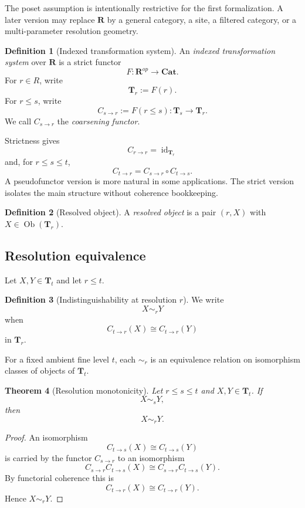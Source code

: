 \documentclass[11pt]{article}
\newtheorem{theorem}{Theorem}[section]
\theoremstyle{definition}
\newtheorem{definition}[theorem]{Definition}
\theoremstyle{remark}
\newcommand{\Rcat}{\mathbf R}
\newcommand{\Tcat}{\mathbf T}
\newcommand{\Cat}{\mathbf{Cat}}
\newcommand{\Ob}{\operatorname{Ob}}
\newcommand{\id}{\operatorname{id}}
\begin{document}
The poset assumption is intentionally restrictive for the first formalization. A later version may replace $\Rcat$ by a general category, a site, a filtered category, or a multi-parameter resolution geometry.

\begin{definition}[Indexed transformation system]
An \emph{indexed transformation system} over $\Rcat$ is a strict functor
\[
F:\Rcat^{op}\longrightarrow\Cat.
\]
For $r\in R$, write
\[
\Tcat_r:=F(r).
\]
For $r\le s$, write
\[
C_{s\to r}:=F(r\le s):\Tcat_s\longrightarrow\Tcat_r.
\]
We call $C_{s\to r}$ the \emph{coarsening functor}.
\end{definition}

Strictness gives
\[
C_{r\to r}=\id_{\Tcat_r}
\]
and, for $r\le s\le t$,
\[
C_{t\to r}=C_{s\to r}\circ C_{t\to s}.
\]
A pseudofunctor version is more natural in some applications. The strict version isolates the main structure without coherence bookkeeping.

\begin{definition}[Resolved object]
A \emph{resolved object} is a pair $(r,X)$ with $X\in\Ob(\Tcat_r)$.
\end{definition}

\subsection{Resolution equivalence}

Let $X,Y\in\Tcat_t$ and let $r\le t$.

\begin{definition}[Indistinguishability at resolution $r$]
We write
\[
X\sim_r Y
\]
when
\[
C_{t\to r}(X)\cong C_{t\to r}(Y)
\]
in $\Tcat_r$.
\end{definition}

For a fixed ambient fine level $t$, each $\sim_r$ is an equivalence relation on isomorphism classes of objects of $\Tcat_t$.

\begin{theorem}[Resolution monotonicity]\label{thm:resolution-monotonicity}
Let $r\le s\le t$ and $X,Y\in\Tcat_t$. If
\[
X\sim_sY,
\]
then
\[
X\sim_rY.
\]
\end{theorem}

\begin{proof}
An isomorphism
\[
C_{t\to s}(X)\cong C_{t\to s}(Y)
\]
is carried by the functor $C_{s\to r}$ to an isomorphism
\[
C_{s\to r}C_{t\to s}(X)
\cong
C_{s\to r}C_{t\to s}(Y).
\]
By functorial coherence this is
\[
C_{t\to r}(X)\cong C_{t\to r}(Y).
\]
Hence $X\sim_rY$.
\end{proof}
\end{document}
